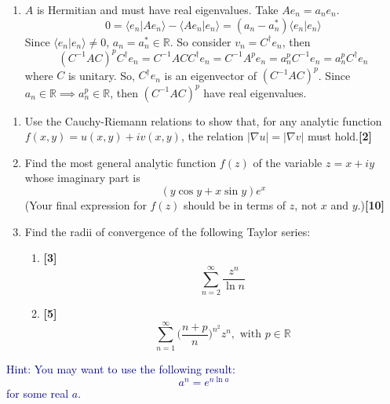 \documentclass[a4paper]{article}
\begin{document}
\begin{ans}
\begin{enumerate}[label=(\alph*)]
\begin{enumerate}[label=(\roman*)]
\end{enumerate}
\item $A$ is Hermitian and must have real eigenvalues. Take $Ae_n=a_ne_n$. 
$$0=\langle e_n|Ae_n\rangle-\langle Ae_n|e_n\rangle=(a_n-a_n^*)\langle e_n|e_n\rangle$$
Since $\langle e_n|e_n\rangle\neq 0$, $a_n=a_n^*\in\mathbb{R}$. So consider $v_n=C^\dag e_n$, then
$$(C^{-1}AC)^pC^\dag e_n=C^{-1}ACC^\dag e_n=C^{-1}A^pe_n=a_n^pC^{-1}e_n=a_n^pC^\dag e_n$$
where $C$ is unitary. So, $C^\dag e_n$ is an eigenvector of $(C^{-1}AC)^p$. Since $a_n\in\mathbb{R}\implies a_n^p\in\mathbb{R}$, then $(C^{-1}AC)^p$ have real eigenvalues.
\end{enumerate}
\end{ans}
\newpage
\begin{qns}\leavevmode
\begin{enumerate}[label=(\alph*)]
\item Use the Cauchy-Riemann relations to show that, for any analytic function $f(x,y)=u(x,y)+iv(x,y)$, the relation $|\nabla u| = |\nabla v|$ must hold.\hfill\textbf{[2]}
\item Find the most general analytic function $f(z)$ of the variable $z = x + i y$ whose imaginary part is
$$(y\cos y + x\sin y)e^x$$
(Your final expression for $f(z)$ should be in terms of $z$, not $x$ and $y$.)\hfill\textbf{[10]}
\item Find the radii of convergence of the following Taylor series:
\begin{enumerate}[label=(\roman*)]
\item \hfill\textbf{[3]}$$\sum_{n=2}^\infty\frac{z^n}{\ln n}$$
\item  \hfill\textbf{[5]}
$$\sum_{n=1}^\infty\bigg(\frac{n+p}{n}\bigg)^{n^2}z^n,\text{ with  }p\in\mathbb{R}$$
\end{enumerate}
\end{enumerate}
\begin{mdframed}
\textcolor{darkblue}{Hint: You may want to use the following result:
$$a^n=e^{n\ln a}$$
for some real $a$.}
\end{mdframed}
\end{qns}
\end{document}
